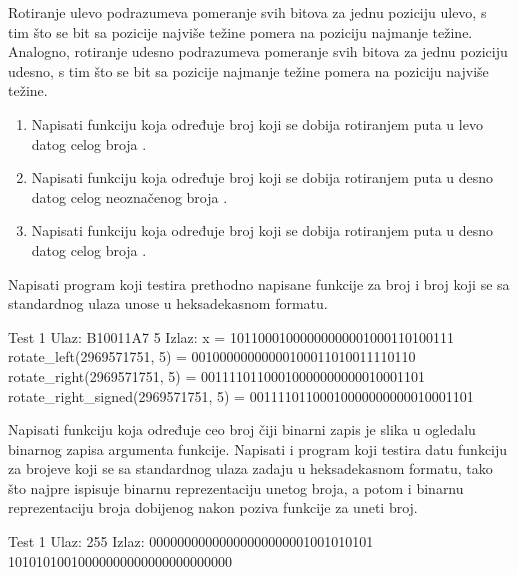 \begin{Exercise}[label=205]
Rotiranje ulevo podrazumeva pomeranje svih bitova za jednu poziciju ulevo, s tim što se bit sa pozicije najviše težine pomera na poziciju najmanje težine. Analogno, rotiranje udesno podrazumeva pomeranje svih bitova za jednu poziciju udesno, s tim što se bit sa pozicije najmanje težine pomera na poziciju najviše težine.
\begin{enumerate}
\item Napisati funkciju  koja određuje broj koji se dobija rotiranjem  puta u levo datog celog broja . 
\item Napisati funkciju  koja određuje broj koji se dobija rotiranjem  puta u desno datog celog neoznačenog broja . 
\item Napisati funkciju  koja određuje broj koji se dobija rotiranjem  puta u desno datog celog broja . 
\end{enumerate}
Napisati program koji testira prethodno napisane funkcije za broj  i broj  koji se sa standardnog ulaza unose u heksadekasnom formatu.

\begin{maxitest}
\begin{test}{Test 1}
Ulaz:   B10011A7 5   
Izlaz:  
  x                                      = 10110001000000000001000110100111
  rotate_left(2969571751,     5)         = 00100000000000100011010011110110
  rotate_right(2969571751,     5)        = 00111101100010000000000010001101
  rotate_right_signed(2969571751,     5) = 00111101100010000000000010001101
\end{test}
\end{maxitest}

\end{Exercise}
\begin{Answer}[ref=205]
\end{Answer}

\begin{Exercise}[label=206]
Napisati funkciju  koja određuje ceo broj čiji binarni zapis je slika u ogledalu binarnog zapisa argumenta funkcije. Napisati i program koji testira datu funkciju za brojeve koji se sa standardnog ulaza zadaju u heksadekasnom formatu, tako što najpre ispisuje binarnu reprezentaciju unetog broja, a potom i binarnu reprezentaciju broja dobijenog nakon poziva funkcije  za uneti broj.

\begin{maxitest}
\begin{test}{Test 1}
Ulaz:  255   
Izlaz:  
  00000000000000000000001001010101
  10101010010000000000000000000000
\end{test}
\end{maxitest}

\end{Exercise}
\begin{Answer}[ref=206]
\end{Answer}


